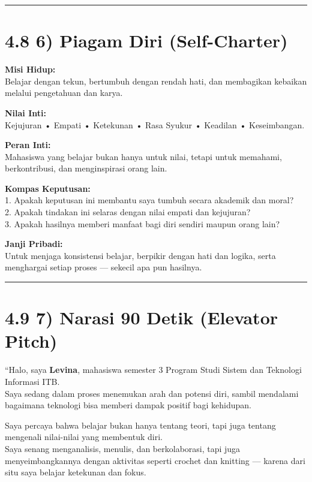 \documentclass[
  letterpaper,
  DIV=11,
  numbers=noendperiod]{scrreprt}
\begin{document}
\begin{center}\rule{0.5\linewidth}{0.5pt}\end{center}

\section{4.8 6) Piagam Diri
(Self-Charter)}\label{piagam-diri-self-charter}

\textbf{Misi Hidup:}\\
Belajar dengan tekun, bertumbuh dengan rendah hati, dan membagikan
kebaikan melalui pengetahuan dan karya.

\textbf{Nilai Inti:}\\
Kejujuran • Empati • Ketekunan • Rasa Syukur • Keadilan • Keseimbangan.

\textbf{Peran Inti:}\\
Mahasiswa yang belajar bukan hanya untuk nilai, tetapi untuk memahami,
berkontribusi, dan menginspirasi orang lain.

\textbf{Kompas Keputusan:}\\
1. Apakah keputusan ini membantu saya tumbuh secara akademik dan
moral?\\
2. Apakah tindakan ini selaras dengan nilai empati dan kejujuran?\\
3. Apakah hasilnya memberi manfaat bagi diri sendiri maupun orang lain?

\textbf{Janji Pribadi:}\\
Untuk menjaga konsistensi belajar, berpikir dengan hati dan logika,
serta menghargai setiap proses --- sekecil apa pun hasilnya.

\begin{center}\rule{0.5\linewidth}{0.5pt}\end{center}

\section{4.9 7) Narasi 90 Detik (Elevator
Pitch)}\label{narasi-90-detik-elevator-pitch}

``Halo, saya \textbf{Levina}, mahasiswa semester 3 Program Studi Sistem
dan Teknologi Informasi ITB.\\
Saya sedang dalam proses menemukan arah dan potensi diri, sambil
mendalami bagaimana teknologi bisa memberi dampak positif bagi
kehidupan.

Saya percaya bahwa belajar bukan hanya tentang teori, tapi juga tentang
mengenali nilai-nilai yang membentuk diri.\\
Saya senang menganalisis, menulis, dan berkolaborasi, tapi juga
menyeimbangkannya dengan aktivitas seperti crochet dan knitting ---
karena dari situ saya belajar ketekunan dan fokus.
\end{document}
